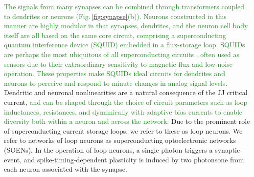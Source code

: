 \documentclass[twocolumn]{article}
\begin{document}
\textcolor{ForestGreen}{The signals from many synapses can be combined through transformers coupled to dendrites or neurons (Fig.\,\ref{fig:synapse}(b)). Neurons constructed in this manner are highly modular in that synapses, dendrites, and the neuron cell body itself are all based on the same core circuit, comprising a superconducting quantum interference device (SQUID) embedded in a flux-storage loop. SQUIDs are perhaps the most ubiquitous of all superconducting circuits \cite{vatu1998,ka1999}, often used as sensors due to their extraordinary sensitivity to magnetic flux and low-noise operation. These properties make SQUIDs ideal circuits for dendrites and neurons to perceive and respond to minute changes in analog signal levels.} Dendritic and neuronal nonlinearities are a natural consequence of the JJ critical current, \textcolor{ForestGreen}{and can be shaped through the choice of circuit parameters such as loop inductances, resistances, and dynamically with adaptive bias currents to enable diversity both within a neuron and across the network.} Due to the prominent role of superconducting current storage loops, we refer to these as loop neurons. We refer to networks of loop neurons as superconducting optoelectronic networks (SOENs). In the operation of loop neurons, a single photon triggers a synaptic event, and spike-timing-dependent plasticity is induced by two photons\textemdash one from each neuron associated with the synapse.
\begin{figure}
\end{figure}
\end{document}
